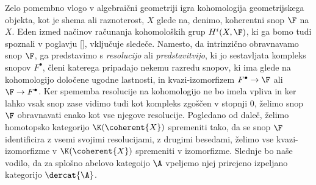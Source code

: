 Zelo pomembno vlogo v algebraični geometriji igra kohomologija geometrijskega objekta, kot je shema ali raznoterost, $X$ glede na, denimo, koherentni snop $\F$ na $X$. Eden izmed načinov računanja kohomoloških grup $H^i(X, \F)$, ki ga bomo tudi spoznali v poglavju \ref{}, vključuje sledeče. 
Namesto, da  intrinzično obravnavamo snop $\F$, ga predstavimo s \ti \emph{resolucijo} ali \emph{predstavitvijo}, ki jo sestavljata kompleks snopov $F^\bullet$, členi katerega pripadajo nekemu razredu snopov, ki ima glede na kohomologijo določene ugodne lastnosti, in kvazi-izomorfizem $F^\bullet \to \F$ ali $\F \to F^\bullet$. Ker spememba resolucije na kohomologijo ne bo imela vpliva in ker lahko vsak snop zase vidimo tudi kot kompleks zgoščen v stopnji $0$, želimo snop $\F$ obravnavati enako kot vse njegove resolucije. 
Pogledano od daleč, želimo homotopsko kategorijo $\K(\coherent{X})$ spremeniti tako, da se snop $\F$ identificira z vsemi svojimi resolucijami, \oz z drugimi besedami, želimo vse kvazi-izomorfizme v $\K(\coherent{X})$ spremeniti v izomorfizme. Slednje bo naše vodilo, da za splošno abelovo kategoijo $\A$ vpeljemo njej prirejeno izpeljano kategorijo $\dercat{\A}$.  




